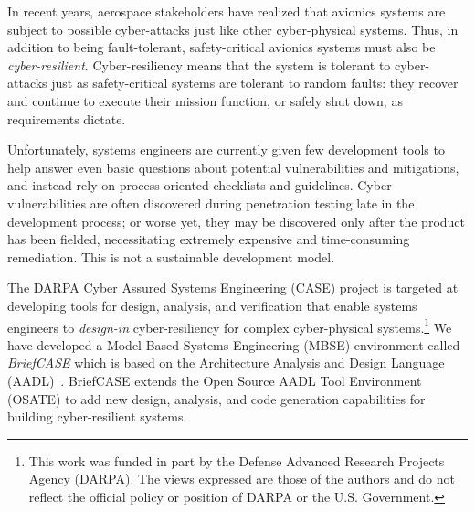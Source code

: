In recent years, aerospace stakeholders have realized that avionics systems are subject to possible cyber-attacks just like other cyber-physical systems.  Thus, in addition to being fault-tolerant, safety-critical avionics systems must also be {\em cyber-resilient}. Cyber-resiliency means that the system is tolerant to cyber-attacks just as safety-critical systems are tolerant to random faults: they recover and continue to execute their mission function, or safely shut down, as requirements dictate.

Unfortunately, systems engineers are currently given few development tools to help answer even basic questions about potential vulnerabilities and mitigations, and instead rely on process-oriented checklists and guidelines.  Cyber vulnerabilities are often discovered during penetration testing late in the development process; or worse yet, they may be discovered only after the product has been fielded, necessitating extremely expensive and time-consuming remediation. This is not a sustainable development model.

The DARPA Cyber Assured Systems Engineering (CASE) project is targeted at developing tools for design, analysis, and verification that enable systems engineers to {\em design-in} cyber-resiliency for complex cyber-physical systems.\footnote{This work was funded in part by the Defense Advanced Research Projects Agency (DARPA).  The views expressed are those of the authors and do not reflect the official policy or position of DARPA or the U.S. Government.}
We have developed a Model-Based Systems Engineering (MBSE) environment called {\em BriefCASE} which is based on the Architecture Analysis and Design Language (AADL)~\cite{aadl}.  BriefCASE extends the Open Source AADL Tool Environment (OSATE) to add new design, analysis, and code generation capabilities for building cyber-resilient systems.

